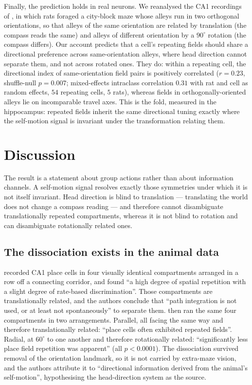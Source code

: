 \documentclass[9pt,lineno]{elife}
\begin{document}
Finally, the prediction holds in real neurons. We reanalysed the CA1 recordings of
\citet{hockeimer2023}, in which rats foraged a city-block maze whose alleys run in two
orthogonal orientations, so that alleys of the same orientation are related by translation (the
compass reads the same) and alleys of different orientation by a $90^\circ$ rotation (the compass
differs). Our account predicts that a cell's repeating fields should share a directional
preference across same-orientation alleys, where head direction cannot separate them, and not
across rotated ones. They do: within a repeating cell, the directional index of same-orientation
field pairs is positively correlated ($r = 0.23$, shuffle-null $p = 0.007$; mixed-effects
intraclass correlation $0.31$ with rat and cell as random effects, $54$ repeating cells, $5$
rats), whereas fields in orthogonally-oriented alleys lie on incomparable travel axes. This is
the fold, measured in the hippocampus: repeated fields inherit the same directional tuning
exactly where the self-motion signal is invariant under the transformation relating them.


\section{Discussion}

The result is a statement about group actions rather than about information channels. A
self-motion signal resolves exactly those symmetries under which it is not itself invariant.
Head direction is blind to translation --- translating the world does not change a compass
reading --- and therefore cannot disambiguate translationally repeated compartments, whereas it
is not blind to rotation and can disambiguate rotationally related ones.

\subsection*{The dissociation exists in the animal data}

\citet{spiers2015} recorded CA1 place cells in four visually identical compartments arranged in a
row off a connecting corridor, and found ``a high degree of spatial repetition with a slight
degree of rate-based discrimination''. Those compartments are translationally related, and the
authors conclude that ``path integration is not used, or at least not spontaneously'' to separate
them. \citet{grieves2016} then ran the same four compartments in two arrangements. Parallel, all
facing the same way and therefore translationally related: ``place cells often exhibited repeated
fields''. Radial, at $60^\circ$ to one another and therefore rotationally related:
``significantly less place field repetition was apparent'' (all $p < 0.0001$). The dissociation
survived removal of the orientation landmark, so it is not carried by extra-maze vision, and the
authors attribute it to ``directional information derived from the animal's self-motion'',
hypothesising the head-direction system as the source.
\end{document}
